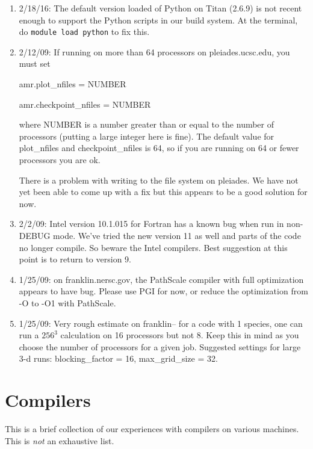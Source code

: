 \begin{enumerate}

\item 2/18/16: The default version loaded of Python on Titan (2.6.9) is not recent enough to support the Python scripts in our build system. At the terminal, do {\tt module load python} to fix this.

\item 2/12/09: If running on more than 64 processors on pleiades.ucsc.edu, you must set

amr.plot\_nfiles = NUMBER

amr.checkpoint\_nfiles = NUMBER

where NUMBER is a number greater than or equal to the number of processors (putting a large integer here is fine). The default value for plot\_nfiles and checkpoint\_nfiles is 64, so if you are running on 64 or fewer processors you are ok.

There is a problem with writing to the file system on pleiades. We have not yet been able to come up with a fix but this appears to be a good solution for now.

\item 2/2/09: Intel version 10.1.015 for Fortran has a known bug when run in non-DEBUG mode. We've tried the new version 11 as well and parts of the code no longer compile. So beware the Intel compilers. Best suggestion at this point is to return to version 9.

\item 1/25/09: on franklin.nersc.gov, the PathScale compiler with full optimization appears to have bug. Please use PGI for now, or reduce the optimization from -O to -O1 with PathScale.

\item 1/25/09: Very rough estimate on franklin-- for a code with 1 species, one can run a $256^3$ calculation on 16 processors but not 8. Keep this in mind as you choose the number of processors for a given job. Suggested settings for large 3-d runs: blocking\_factor = 16, max\_grid\_size = 32. 
\end{enumerate}

\newpage
\section{Compilers}

This is a brief collection of our experiences with compilers on various machines.  This is {\em not} an exhaustive list.

